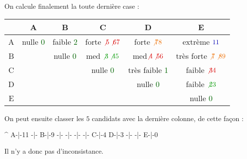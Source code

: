 \documentclass{article}
\newcommand{\gre}[1]{\textcolor{darkgreen}{#1}}
\newcommand{\blu}[1]{\textcolor{darkblue}{#1}}
\newcommand{\ora}[1]{\textcolor{darko}{#1}}
\newcommand{\red}[1]{\textcolor{darkred}{#1}}
\begin{document}
On calcule finalement la toute dernière case :

\begin{center}
	\begin{tabular}{|*{6}{c|}}
	\hline
	& A & B & C & D & E \\
	\hline
	A & nulle \gre{0} & faible \gre{2}& forte $\red{\not{5} \not{6} 7}$& forte $\ora{\not{7} 8}$ & extrème $\blu{11}$\\
	\hline
	B & & nulle \gre{0}& med $\gre{\not{3} \not{4} 5}$& med$\red{\not{4} \not{5} 6}$ & très forte $\ora{\not{7} \not{8} 9}$\\
	\hline
	C & & & nulle \gre{0} & très faible \gre{1}& faible $\red{\not{3} 4}$\\
	\hline
	D & & & & nulle \gre{0}& faible $\gre{\not{2} 3}$ \\
	\hline
	E & & & & & nulle \gre{0}\\
	\hline
	\end{tabular}
\end{center}

On peut ensuite classer les $5$ candidats avec la dernière colonne, de cette façon : 
\begin{center}
	\begin{boxedverbatim}
  ^
A-|-11
 -|-
B-|-9
 -|-
 -|-
 -|-
 -|-
C-|-4
D-|-3
 -|-
 -|-
E-|-0
	\end{boxedverbatim}
\end{center}

Il n'y a donc pas d'inconsistance.
\end{document}
